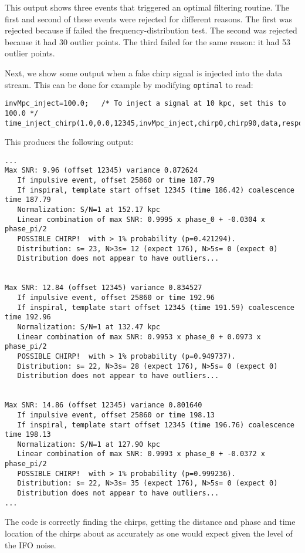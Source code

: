 This output shows three events that triggered an optimal filtering
routine.  The first and second of these events were rejected for
different reasons.  The first was rejected because if failed the
frequency-distribution test.  The second was rejected because it had 30
outlier points.  The third failed for the same reason: it had 53
outlier points.

Next, we show some output when a fake chirp signal is injected into the data stream.  This
can be done for example by modifying {\tt optimal} to read:
\begin{verbatim}
invMpc_inject=100.0;   /* To inject a signal at 10 kpc, set this to 100.0 */
time_inject_chirp(1.0,0.0,12345,invMpc_inject,chirp0,chirp90,data,response,output0,npoint);
\end{verbatim}
This produces the following output:
\begin{verbatim}
...
Max SNR: 9.96 (offset 12345) variance 0.872624
   If impulsive event, offset 25860 or time 187.79
   If inspiral, template start offset 12345 (time 186.42) coalescence time 187.79
   Normalization: S/N=1 at 152.17 kpc
   Linear combination of max SNR: 0.9995 x phase_0 + -0.0304 x phase_pi/2
   POSSIBLE CHIRP!  with > 1% probability (p=0.421294).
   Distribution: s= 23, N>3s= 12 (expect 176), N>5s= 0 (expect 0)
   Distribution does not appear to have outliers...


Max SNR: 12.84 (offset 12345) variance 0.834527
   If impulsive event, offset 25860 or time 192.96
   If inspiral, template start offset 12345 (time 191.59) coalescence time 192.96
   Normalization: S/N=1 at 132.47 kpc
   Linear combination of max SNR: 0.9953 x phase_0 + 0.0973 x phase_pi/2
   POSSIBLE CHIRP!  with > 1% probability (p=0.949737).
   Distribution: s= 22, N>3s= 28 (expect 176), N>5s= 0 (expect 0)
   Distribution does not appear to have outliers...


Max SNR: 14.86 (offset 12345) variance 0.801640
   If impulsive event, offset 25860 or time 198.13
   If inspiral, template start offset 12345 (time 196.76) coalescence time 198.13
   Normalization: S/N=1 at 127.90 kpc
   Linear combination of max SNR: 0.9993 x phase_0 + -0.0372 x phase_pi/2
   POSSIBLE CHIRP!  with > 1% probability (p=0.999236).
   Distribution: s= 22, N>3s= 35 (expect 176), N>5s= 0 (expect 0)
   Distribution does not appear to have outliers...
...
\end{verbatim}
The code is correctly finding the chirps, getting the distance and phase and
time location of the chirps about as accurately as one would expect given
the level of the IFO noise.

